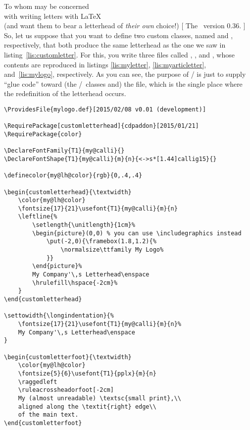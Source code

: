 \begin{letterhead}{
	To whom may be concerned\\
	with writing letters with \LaTeX\\
	(and want them to bear a letterhead
	of \emph{their own} choice!)
}[
	The \Bundle\ version 0.36.
]
So, let us suppose that you want to define two custom classes, named
 and , respectively, that both
produce the same letterhead as the one we saw in listing~\ref{lis:customletter}.
For this, you write three files called ,
, and , whose contents are
reproduced in listings \ref{lis:myletter}, \ref{lis:myarticletter},
and~\ref{lis:mylogo}, respectively.  As you can see, the purpose of
\slash{} is just to supply ``glue
code'' toward (the \lcdp\slash\acdp\ classes and) the  file,
which is the single place where the redefinition of the letterhead occurs.

\begin{listing}[tbp]
	\cleantop
\begin{verbatim}
\ProvidesFile{mylogo.def}[2015/02/08 v0.01 (development)]

\RequirePackage[customletterhead]{cdpaddon}[2015/01/21]
\RequirePackage{color}

\DeclareFontFamily{T1}{my@calli}{}
\DeclareFontShape{T1}{my@calli}{m}{n}{<->s*[1.44]callig15}{}

\definecolor{my@lh@color}{rgb}{0,.4,.4}

\begin{customletterhead}{\textwidth}
    \color{my@lh@color}
    \fontsize{17}{21}\usefont{T1}{my@calli}{m}{n}
    \leftline{%
        \setlength{\unitlength}{1cm}%
        \begin{picture}(0,0) % you can use \includegraphics instead
            \put(-2,0){\framebox(1.8,1.2){%
                \normalsize\ttfamily My Logo%
            }}
        \end{picture}%
        My Company'\,s Letterhead\enspace
        \hrulefill\hspace{-2cm}%
    }
\end{customletterhead}

\settowidth{\longindentation}{%
    \fontsize{17}{21}\usefont{T1}{my@calli}{m}{n}%
    My Company'\,s Letterhead\enspace
}

\begin{customletterfoot}{\textwidth}
    \color{my@lh@color}
    \fontsize{5}{6}\usefont{T1}{pplx}{m}{n}
    \raggedleft
    \ruleacrossheadorfoot[-2cm]
    My (almost unreadable) \textsc{small print},\\
    aligned along the \textit{right} edge\\
    of the main text.
\end{customletterfoot}


\end{verbatim}
\end{listing}
\end{letterhead}
